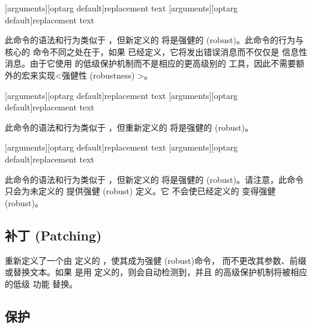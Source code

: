 \documentclass{ltxdockit}[2010/09/26]
\begin{document}
\begin{ltxsyntax}

  [arguments][optarg default]{replacement text}
  [arguments][optarg default]{replacement text}

  此命令的语法和行为类似于 ，但新定义的 
  将是强健的 (robust)。此命令的行为与 \latex 核心的 
  命令不同之处在于，如果  已经定义，它将发出错误消息而不仅仅是
  信息性消息。由于它使用 \etex 的低级保护机制而不是相应的更高级别的 \latex
  工具，因此不需要额外的宏来实现<强健性 (robustness) >。

  [arguments][optarg default]{replacement text}
  [arguments][optarg default]{replacement text}

  此命令的语法和行为类似于 ，但重新定义的 
  将是强健的 (robust)。

  [arguments][optarg default]{replacement text}
  [arguments][optarg default]{replacement text}

  此命令的语法和行为类似于 ，但新定义的 
  将是强健的 (robust)。请注意，此命令只会为未定义的  提供强健 (robust) 定义。它
  不会使已经定义的  变得强健 (robust)。
\end{ltxsyntax}

\subsection{补丁 (Patching)}
\label{use:pat}

\begin{ltxsyntax}


  重新定义了一个由  定义的 ，使其成为强健 (robust)命令，
  而不更改其参数、前缀或替换文本。如果  是用 
  定义的，则会自动检测到，并且 \latex 的高级保护机制将被相应的低级 \etex 功能
  替换。

\end{ltxsyntax}

\subsection{保护}
\label{use:pro}
\end{document}
